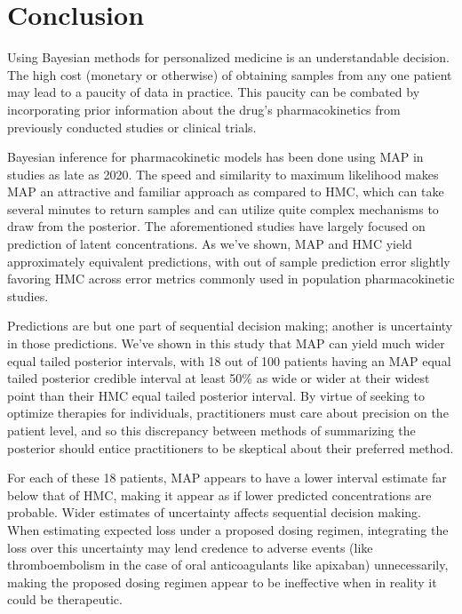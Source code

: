 \section{Conclusion}

Using Bayesian methods for personalized medicine is an understandable decision.  The high cost (monetary or otherwise) of obtaining samples from any one patient may lead to a paucity of data in practice.  This paucity can be combated by incorporating prior information about the drug’s pharmacokinetics from previously conducted studies or clinical trials.

Bayesian inference for pharmacokinetic models has been done using MAP in studies as late as 2020.  The speed and similarity to maximum likelihood makes MAP an attractive and familiar approach as compared to HMC, which can take several minutes to return samples and can utilize quite complex mechanisms to draw from the posterior. The aforementioned studies have largely focused on prediction of latent concentrations.  As we’ve shown, MAP and HMC yield approximately equivalent predictions, with out of sample prediction error slightly favoring HMC across error metrics commonly used in population pharmacokinetic studies. 

Predictions are but one part of sequential decision making; another is uncertainty in those predictions.  We’ve shown in this study that MAP can yield much wider equal tailed posterior intervals, with 18 out of 100 patients having an MAP equal tailed posterior credible interval at least 50\% as wide or wider at their widest point than their HMC equal tailed posterior interval.  By virtue of seeking to optimize therapies for individuals, practitioners must care about precision on the patient level, and so this discrepancy between  methods of summarizing the posterior should entice practitioners to be skeptical about their preferred method.

For each of these 18 patients, MAP appears to have a lower interval estimate far below that of HMC, making it appear as if lower predicted concentrations are probable. Wider estimates of uncertainty affects sequential decision making.  When estimating expected loss under a proposed dosing regimen, integrating the loss over this uncertainty may lend credence to adverse events (like thromboembolism in the case of oral anticoagulants like apixaban) unnecessarily, making the proposed dosing regimen appear to be ineffective when in reality it could be therapeutic. 

